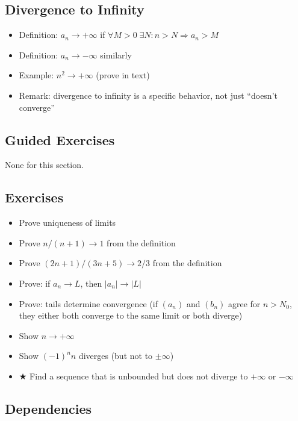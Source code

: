\documentclass[
  10pt,
  letterpaper,
]{scrbook}
\providecommand{\tightlist}{%
  \setlength{\itemsep}{0pt}\setlength{\parskip}{0pt}}
\begin{document}
\subsection{Divergence to Infinity}\label{divergence-to-infinity}

\begin{itemize}
\tightlist
\item
  Definition: \(a_n \to +\infty\) if
  \(\forall M > 0 \; \exists N: n > N \Rightarrow a_n > M\)
\item
  Definition: \(a_n \to -\infty\) similarly
\item
  Example: \(n^2 \to +\infty\) (prove in text)
\item
  Remark: divergence to infinity is a specific behavior, not just
  ``doesn't converge''
\end{itemize}

\subsection{Guided Exercises}\label{guided-exercises-3}

None for this section.

\subsection{Exercises}\label{exercises-6}

\begin{itemize}
\tightlist
\item
  Prove uniqueness of limits
\item
  Prove \(n/(n+1) \to 1\) from the definition
\item
  Prove \((2n+1)/(3n+5) \to 2/3\) from the definition
\item
  Prove: if \(a_n \to L\), then \(|a_n| \to |L|\)
\item
  Prove: tails determine convergence (if \((a_n)\) and \((b_n)\) agree
  for \(n > N_0\), they either both converge to the same limit or both
  diverge)
\item
  Show \(n \to +\infty\)
\item
  Show \((-1)^n n\) diverges (but not to \(\pm\infty\))
\item
  ★ Find a sequence that is unbounded but does not diverge to
  \(+\infty\) or \(-\infty\)
\end{itemize}

\subsection{Dependencies}\label{dependencies-6}
\end{document}
